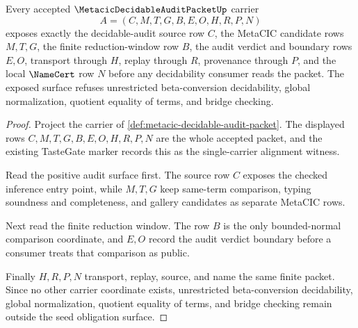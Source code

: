 \begin{theorem}
\label{thm:metacic-decidable-audit-seed-obligation-surface}
Every accepted $\MetacicDecidableAuditPacketUp$ carrier
$$
A=(C,M,T,G,B,E,O,H,R,P,N)
$$
exposes exactly the decidable-audit source row $C$, the MetaCIC candidate rows $M,T,G$, the finite reduction-window row $B$, the audit verdict and boundary rows $E,O$, transport through $H$, replay through $R$, provenance through $P$, and the local $\NameCert$ row $N$ before any decidability consumer reads the packet. The exposed surface refuses unrestricted beta-conversion decidability, global normalization, quotient equality of terms, and bridge checking.
\end{theorem}
\begin{proof}
Project the carrier of \autoref{def:metacic-decidable-audit-packet}. The displayed rows $C,M,T,G,B,E,O,H,R,P,N$ are the whole accepted packet, and the existing TasteGate marker records this as the single-carrier alignment witness.

Read the positive audit surface first. The source row $C$ exposes the checked inference entry point, while $M,T,G$ keep same-term comparison, typing soundness and completeness, and gallery candidates as separate MetaCIC rows.

Next read the finite reduction window. The row $B$ is the only bounded-normal comparison coordinate, and $E,O$ record the audit verdict boundary before a consumer treats that comparison as public.

Finally $H,R,P,N$ transport, replay, source, and name the same finite packet. Since no other carrier coordinate exists, unrestricted beta-conversion decidability, global normalization, quotient equality of terms, and bridge checking remain outside the seed obligation surface.
\end{proof}

